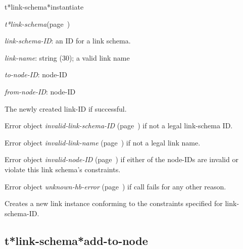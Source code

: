 \begin{description}
\item [Name:]  t*link-schema*instantiate

\item [Class:] {\sl t*link-schema}\hfill(page~\pageref{t*link-schema})

\item [Parameters:]
\item {\sl link-schema-ID}:  an ID for a link schema.

\item {\sl link-name}:  string (30); a valid link name

\item {\sl to-node-ID}:  node-ID


\item {\sl from-node-ID}:  node-ID


\item [Return-value:]
The newly created link-ID if successful.

Error object {\sl invalid-link-schema-ID} (page~\pageref{invalid-link-schema-ID}) if not
a legal link-schema ID.

Error object {\sl invalid-link-name} (page~\pageref{invalid-link-name}) if not a 
legal link name.

Error object {\sl invalid-node-ID} (page~\pageref{invalid-node-ID}) if either of 
the node-IDs are invalid or violate this link schema's
constraints. 

Error object {\sl unknown-hb-error} (page~\pageref{unknown-hb-error}) if call fails for
any other reason.

\item [Description:]

Creates a new link instance conforming to the constraints
specified for link-schema-ID. 

\item [Public:]



\end{description}
\horizontalline

\subsection{t*link-schema*add-to-node}
\label{t*link-schema*add-to-node}

